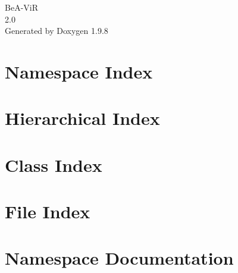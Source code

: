 \documentclass[twoside]{book}
\newcommand{\+}{\discretionary{\mbox{\scriptsize$\hookleftarrow$}}{}{}}
\newcommand{\clearemptydoublepage}{%
    \newpage{\pagestyle{empty}\cleardoublepage}%
  }
\begin{document}
  \raggedbottom
    \hypersetup{pageanchor=false,
                bookmarksnumbered=true,
                pdfencoding=unicode
               }
  \begin{titlepage}
  \vspace*{7cm}
  \begin{center}%
  {\Large Be\+A-\/\+ViR}\\
  [1ex]\large 2.\+0 \\
  \vspace*{1cm}
  {\large Generated by Doxygen 1.9.8}\\
  \end{center}
  \end{titlepage}
  \clearemptydoublepage
  \tableofcontents
  \clearemptydoublepage
  \hypersetup{pageanchor=true}
\chapter{Namespace Index}

\chapter{Hierarchical Index}

\chapter{Class Index}

\chapter{File Index}

\chapter{Namespace Documentation}


















\end{document}
